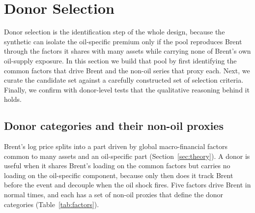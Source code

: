 \section{Donor Selection}\label{sec:donoraudit}
Donor selection is the identification step of the whole design, because the synthetic can isolate the oil-specific premium only if the pool reproduces Brent through the factors it
shares with many assets while carrying none of Brent's own oil-supply exposure. In this
section we build that pool by first identifying the common factors that drive Brent and the
non-oil series that proxy each. Next, we curate the candidate set against a carefully constructed set of selection criteria. Finally, we confirm with donor-level tests that the qualitative reasoning behind it
holds. 

\subsection{Donor categories and their non-oil proxies}
Brent's log price splits into a part driven by global macro-financial factors common to many
assets and an oil-specific part (Section~\ref{sec:theory}). A donor is useful when it shares
Brent's loading on the common factors but carries no loading on the oil-specific component,
because only then does it track Brent before the event and decouple when the oil shock
fires. Five factors drive Brent in normal times, and each has a set of non-oil proxies that
define the donor categories (Table~\ref{tab:factors}).

